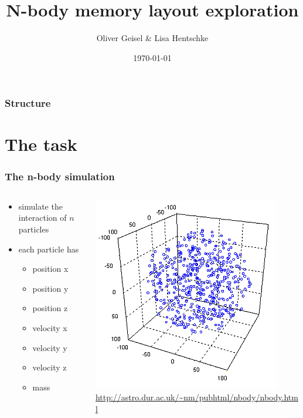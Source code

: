 \documentclass[aspectratio=169]{beamer}
\title{N-body memory layout exploration}
\author{Oliver Geisel \& Lisa Hentschke}
\date{\today}
\begin{document}
\begin{frame}
	\titlepage
\end{frame}

\begin{frame}
	\frametitle{Structure}
	\tableofcontents
\end{frame}

\section{The task} 
\begin{frame}
	\frametitle{The n-body simulation}
	\begin{columns}
	\begin{column}{0.55\textwidth}
		\begin{itemize}
			\item simulate the interaction of \(n\) particles
			\item each particle has
			\begin{itemize}
				\smallskip
				\item position x
				\item position y
				\item position z
				\smallskip
				\item velocity x
				\item velocity y
				\item velocity z
				\smallskip
				\item mass
			\end{itemize}
		\end{itemize}
	\end{column}
	
	\begin{column}{0.45\textwidth}
		\includegraphics[scale=0.65]{resources/nbody.png}
		\tiny \url{http://astro.dur.ac.uk/~nm/pubhtml/nbody/nbody.html}
	\end{column}
	
	\end{columns}
	
\end{frame}
\end{document}
